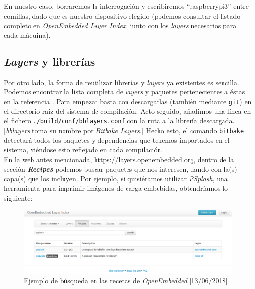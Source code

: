 En nuestro caso, borraremos la interrogación y escribiremos ``raspberrypi3'' entre comillas, dado que es nuestro dispositivo elegido (podemos consultar el listado completo en \href{http://layers.openembedded.org/layerindex/branch/master/machines/?q=&browse=1}{\textit{OpenEmbedded Layer Index}}, junto con los \textit{layers} necesarios para cada máquina).\\

\subsection{\textit{Layers} y librerías}

Por otro lado, la forma de reutilizar librerías y \textit{layers} ya existentes es sencilla. Podemos encontrar la lista completa de \textit{layers} y paquetes pertenecientes a éstas en la referencia \cite{yocto-layers-list}. Para empezar basta con descargarlas (también mediante \texttt{git}) en el directorio raíz del sistema de compilación. Acto seguido, añadimos una línea en el fichero \texttt{./build/conf/bblayers.conf} con la ruta a la librería descargada. [\textit{bblayers} toma su nombre por \textit{Bitbake Layers}.] Hecho esto, el comando \texttt{bitbake} detectará todos los paquetes y dependencias que tenemos importados en el sistema, viéndose esto reflejado en cada compilación.\\

En la web antes mencionada, \url{https://layers.openembedded.org}, dentro de la sección \textbf{\textit{Recipes}} podemos buscar paquetes que nos interesen, dando con la(s) capa(s) que los incluyen. Por ejemplo, si quisiéramos utilizar \textit{PSplash}, una herramienta para imprimir imágenes de carga embebidas, obtendríamos lo siguiente:

\begin{figure}[H]
	\centering
	\includegraphics[width=\linewidth]{imagenes/yocto-recipe-search-example.png}
	\caption{Ejemplo de búsqueda en las recetas de \textit{OpenEmbedded} [13/06/2018]}
	\label{yocto-recipe-search-example}
\end{figure}

